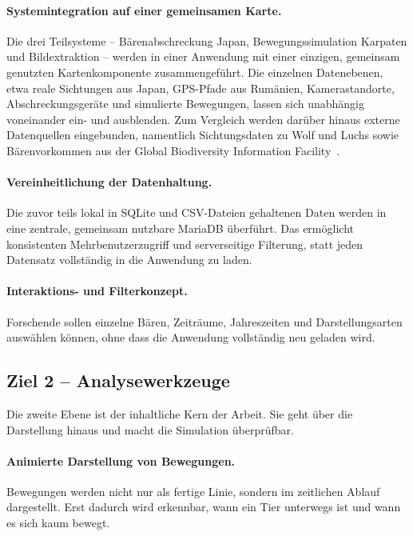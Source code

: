 \documentclass[12pt,a4paper]{scrreprt}
\begin{document}
\paragraph{Systemintegration auf einer gemeinsamen Karte.}
Die drei Teilsysteme -- Bärenabschreckung Japan, Bewegungssimulation
Karpaten und Bildextraktion -- werden in einer Anwendung mit einer
einzigen, gemeinsam genutzten Kartenkomponente zusammengeführt. Die
einzelnen Datenebenen, etwa reale Sichtungen aus Japan, GPS-Pfade aus
Rumänien, Kamerastandorte, Abschreckungsgeräte und simulierte
Bewegungen, lassen sich unabhängig voneinander ein- und ausblenden. Zum
Vergleich werden darüber hinaus externe Datenquellen eingebunden,
namentlich Sichtungsdaten zu Wolf und Luchs sowie Bärenvorkommen aus
der Global Biodiversity Information Facility~\cite{gbif}.

\paragraph{Vereinheitlichung der Datenhaltung.}
Die zuvor teils lokal in SQLite und CSV-Dateien gehaltenen Daten werden
in eine zentrale, gemeinsam nutzbare MariaDB überführt. Das ermöglicht
konsistenten Mehrbenutzerzugriff und serverseitige Filterung, statt
jeden Datensatz vollständig in die Anwendung zu laden.

\paragraph{Interaktions- und Filterkonzept.}
Forschende sollen einzelne Bären, Zeiträume, Jahreszeiten und
Darstellungsarten auswählen können, ohne dass die Anwendung vollständig
neu geladen wird.

\subsection*{Ziel 2 -- Analysewerkzeuge}

Die zweite Ebene ist der inhaltliche Kern der Arbeit. Sie geht über die
Darstellung hinaus und macht die Simulation überprüfbar.

\paragraph{Animierte Darstellung von Bewegungen.}
Bewegungen werden nicht nur als fertige Linie, sondern im zeitlichen
Ablauf dargestellt. Erst dadurch wird erkennbar, wann ein Tier
unterwegs ist und wann es sich kaum bewegt.
\end{document}
